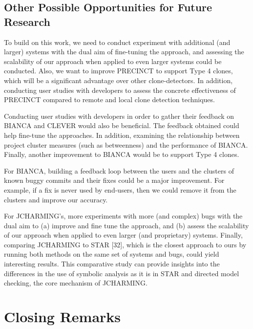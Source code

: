 \documentclass[12pt]{report}
\begin{document}
\subsection{Other Possible Opportunities for Future
Research}\label{other-possible-opportunities-for-future-research}

To build on this work, we need to conduct experiment with additional
(and larger) systems with the dual aim of fine-tuning the approach, and
assessing the scalability of our approach when applied to even larger
systems could be conducted. Also, we want to improve PRECINCT to support
Type 4 clones, which will be a significant advantage over other
clone-detectors. In addition, conducting user studies with developers to
assess the concrete effectiveness of PRECINCT compared to remote and
local clone detection techniques.

Conducting user studies with developers in order to gather their
feedback on BIANCA and CLEVER would also be beneficial. The feedback
obtained could help fine-tune the approaches. In addition, examining the
relationship between project cluster measures (such as betweenness) and
the performance of BIANCA. Finally, another improvement to BIANCA would
be to support Type 4 clones.

For BIANCA, building a feedback loop between the users and the clusters
of known buggy commits and their fixes could be a major improvement. For
example, if a fix is never used by end-users, then we could remove it
from the clusters and improve our accuracy.

For JCHARMING's, more experiments with more (and complex) bugs with the
dual aim to (a) improve and fine tune the approach, and (b) assess the
scalability of our approach when applied to even larger (and
proprietary) systems. Finally, comparing JCHARMING to STAR {[}32{]},
which is the closest approach to ours by running both methods on the
same set of systems and bugs, could yield interesting results. This
comparative study can provide insights into the differences in the use
of symbolic analysis as it is in STAR and directed model checking, the
core mechanism of JCHARMING.

\section{Closing Remarks}\label{closing-remarks}
\end{document}
